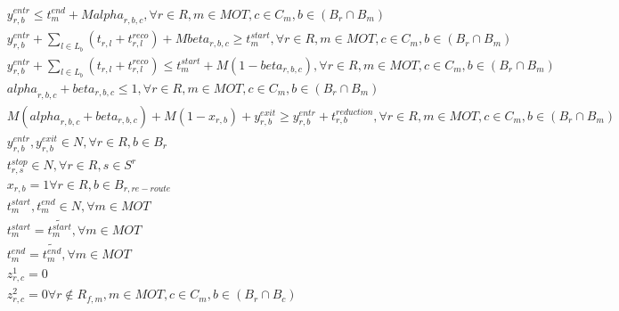\begin{align}
  & y_{r , b}^{e n t r} \leq t_{m}^{e n d} + M \mathit{alpha}_{r , b , c} , \forall r \in R , m \in \mathit{MOT} , c \in C_{m} , b \in \left(B_{r} \cap B_{m}\right) \tag{eq\_0043} \\
  & y_{r , b}^{e n t r} + \sum_{l \in L_{b}} \left(t_{r , l} + t_{r , l}^{r e c o}\right) + M \mathit{beta}_{r , b , c} \geq t_{m}^{s t a r t} , \forall r \in R , m \in \mathit{MOT} , c \in C_{m} , b \in \left(B_{r} \cap B_{m}\right) \tag{eq\_0044} \\
  & y_{r , b}^{e n t r} + \sum_{l \in L_{b}} \left(t_{r , l} + t_{r , l}^{r e c o}\right) \leq t_{m}^{s t a r t} + M \left(1 - \mathit{beta}_{r , b , c}\right) , \forall r \in R , m \in \mathit{MOT} , c \in C_{m} , b \in \left(B_{r} \cap B_{m}\right) \tag{eq\_0045} \\
  & \mathit{alpha}_{r , b , c} + \mathit{beta}_{r , b , c} \leq 1 , \forall r \in R , m \in \mathit{MOT} , c \in C_{m} , b \in \left(B_{r} \cap B_{m}\right) \tag{eq\_0046} \\
  & M \left(\mathit{alpha}_{r , b , c} + \mathit{beta}_{r , b , c}\right) + M \left(1 - x_{r , b}\right) + y_{r , b}^{e x i t} \geq y_{r , b}^{e n t r} + t_{r , b}^{r e d u c t i o n} , \forall r \in R , m \in \mathit{MOT} , c \in C_{m} , b \in \left(B_{r} \cap B_{m}\right) \tag{eq\_0047} \\
  & y_{r , b}^{e n t r} , y_{r , b}^{e x i t} \in N , \forall r \in R , b \in B_{r} \tag{eq\_0049} \\
  & t_{r , s}^{s t o p} \in N , \forall r \in R , s \in S^{r} \tag{eq\_0052} \\
  & x_{r , b} = 1 \forall r \in R , b \in B_{r , r e - r o u t e} \tag{eq\_0063} \\
  & t_{m}^{s t a r t} , t_{m}^{e n d} \in N , \forall m \in \mathit{MOT} \tag{eq\_0068} \\
  & t_{m}^{s t a r t} = \tilde{t_{m}^{s t a r t}} , \forall m \in \mathit{MOT} \tag{eq\_0073} \\
  & t_{m}^{e n d} = \tilde{t_{m}^{e n d}} , \forall m \in \mathit{MOT} \tag{eq\_0074} \\
  & z_{r , c}^{1} = 0 \tag{eq\_0083\_a} \\
  & z_{r , c}^{2} = 0 \forall r \notin R_{f , m} , m \in \mathit{MOT} , c \in C_{m} , b \in \left(B_{r} \cap B_{c}\right) \tag{eq\_0083\_b} \\
\end{align}
